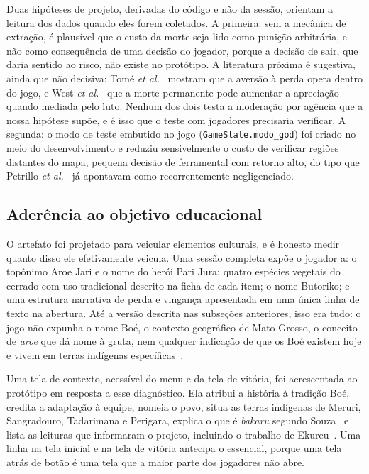 \documentclass[conference]{IEEEtran}
\begin{document}
Duas hipóteses de projeto, derivadas do código e não da sessão, orientam a leitura dos
dados quando eles forem coletados. A primeira: sem a mecânica de extração, é plausível
que o custo da morte seja lido como punição arbitrária, e não como consequência de uma
decisão do jogador, porque a decisão de sair, que daria sentido ao risco, não existe no
protótipo. A literatura próxima é sugestiva, ainda que não decisiva: Tomé
\textit{et al.}~\cite{tome2020} mostram que a aversão à perda opera dentro do jogo, e West
\textit{et al.}~\cite{west2022} que a morte permanente pode aumentar a apreciação quando
mediada pelo luto. Nenhum dos dois testa a moderação por agência que a nossa hipótese
supõe, e é isso que o teste com jogadores precisaria verificar. A segunda: o modo de
teste embutido no jogo (\texttt{GameState.modo\_god}) foi criado no meio do
desenvolvimento e reduziu sensivelmente o custo de verificar regiões distantes do mapa,
pequena decisão de ferramental com retorno alto, do tipo que Petrillo \textit{et
al.}~\cite{petrillo2009} já apontavam como recorrentemente negligenciado.

\subsection{Aderência ao objetivo educacional}

O artefato foi projetado para veicular elementos culturais, e é honesto medir quanto
disso ele efetivamente veicula. Uma sessão completa expõe o jogador a: o topônimo Aroe
Jari e o nome do herói Pari Jura; quatro espécies vegetais do cerrado com uso
tradicional descrito na ficha de cada item; o nome Butoriko; e uma estrutura narrativa
de perda e vingança apresentada em uma única linha de texto na abertura. Até a versão descrita nas
subseções anteriores, isso era tudo: o jogo não expunha o nome Boé, o contexto geográfico
de Mato Grosso, o conceito de \textit{aroe} que dá nome à gruta, nem qualquer indicação de
que os Boé existem hoje e vivem em terras indígenas
específicas~\cite{serpa2025,ibge2025}.

Uma tela de contexto, acessível do menu e da tela de vitória, foi acrescentada ao
protótipo em resposta a esse diagnóstico. Ela atribui a história à tradição Boé, credita a
adaptação à equipe, nomeia o povo, situa as terras indígenas de Meruri, Sangradouro,
Tadarimana e Perigara, explica o que é \textit{bakaru} segundo Souza~\cite{souzabakaru} e
lista as leituras que informaram o projeto, incluindo o trabalho de
Ekureu~\cite{ekureu2025}. Uma linha na tela inicial e na tela de vitória antecipa o
essencial, porque uma tela atrás de botão é uma tela que a maior parte dos jogadores não
abre.
\end{document}
